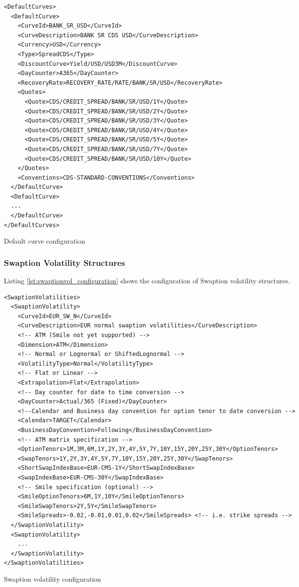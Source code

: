 \documentclass[12pt, a4paper]{article}
\newenvironment{longlisting}{\captionsetup{type=listing}}{}
\begin{document}
\begin{longlisting}
\begin{verbatim}
<DefaultCurves>
  <DefaultCurve>
    <CurveId>BANK_SR_USD</CurveId>
    <CurveDescription>BANK SR CDS USD</CurveDescription>
    <Currency>USD</Currency> 
    <Type>SpreadCDS</Type>
    <DiscountCurve>Yield/USD/USD3M</DiscountCurve>
    <DayCounter>A365</DayCounter>
    <RecoveryRate>RECOVERY_RATE/RATE/BANK/SR/USD</RecoveryRate>
    <Quotes>
      <Quote>CDS/CREDIT_SPREAD/BANK/SR/USD/1Y</Quote>
      <Quote>CDS/CREDIT_SPREAD/BANK/SR/USD/2Y</Quote>
      <Quote>CDS/CREDIT_SPREAD/BANK/SR/USD/3Y</Quote>
      <Quote>CDS/CREDIT_SPREAD/BANK/SR/USD/4Y</Quote>
      <Quote>CDS/CREDIT_SPREAD/BANK/SR/USD/5Y</Quote>
      <Quote>CDS/CREDIT_SPREAD/BANK/SR/USD/7Y</Quote>
      <Quote>CDS/CREDIT_SPREAD/BANK/SR/USD/10Y</Quote>
    </Quotes>
    <Conventions>CDS-STANDARD-CONVENTIONS</Conventions>
  </DefaultCurve>
  <DefaultCurve>
  ...
  </DefaultCurve>
</DefaultCurves>
\end{verbatim}
\caption{Default curve configuration}
\label{lst:defaultcurve_configuration}
\end{longlisting}

\subsubsection{Swaption Volatility Structures}

Listing \ref{lst:swaptionvol_configuration} shows the configuration of Swaption volatility structures.

\begin{longlisting}
\begin{verbatim}
<SwaptionVolatilities>    
  <SwaptionVolatility>
    <CurveId>EUR_SW_N</CurveId>
    <CurveDescription>EUR normal swaption volatilities</CurveDescription>
    <!-- ATM (Smile not yet supported) -->
    <Dimension>ATM</Dimension>
    <!-- Normal or Lognormal or ShiftedLognormal -->
    <VolatilityType>Normal</VolatilityType>
    <!-- Flat or Linear -->
    <Extrapolation>Flat</Extrapolation>
    <!-- Day counter for date to time conversion -->
    <DayCounter>Actual/365 (Fixed)</DayCounter>
    <!--Calendar and Business day convention for option tenor to date conversion -->
    <Calendar>TARGET</Calendar>
    <BusinessDayConvention>Following</BusinessDayConvention>
    <!-- ATM matrix specification -->
    <OptionTenors>1M,3M,6M,1Y,2Y,3Y,4Y,5Y,7Y,10Y,15Y,20Y,25Y,30Y</OptionTenors>
    <SwapTenors>1Y,2Y,3Y,4Y,5Y,7Y,10Y,15Y,20Y,25Y,30Y</SwapTenors>
    <ShortSwapIndexBase>EUR-CMS-1Y</ShortSwapIndexBase>
    <SwapIndexBase>EUR-CMS-30Y</SwapIndexBase>
    <!-- Smile specification (optional) -->
    <SmileOptionTenors>6M,1Y,10Y</SmileOptionTenors>
    <SmileSwapTenors>2Y,5Y</SmileSwapTenors>
    <SmileSpreads>-0.02,-0.01,0.01,0.02</SmileSpreads> <!-- i.e. strike spreads -->
  </SwaptionVolatility>
  <SwaptionVolatility>
    ...
  </SwaptionVolatility>
</SwaptionVolatilities>
\end{verbatim}
\caption{Swaption volatility configuration}
\label{lst:swaptionvol_configuration}
\end{longlisting}
\end{document}
